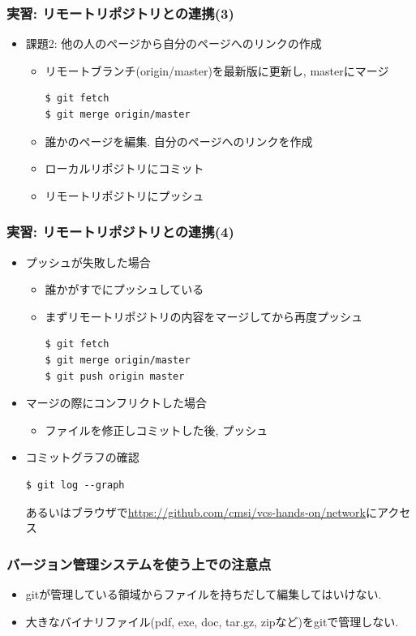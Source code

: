 \begin{frame}[t,fragile]
  \frametitle{実習: リモートリポジトリとの連携(3)}
  \begin{itemize}
  \item 課題2: 他の人のページから自分のページへのリンクの作成
    \begin{itemize}
      \item リモートブランチ(origin/master)を最新版に更新し, masterにマージ
\begin{lstlisting}
$ git fetch
$ git merge origin/master
\end{lstlisting}
      \item 誰かのページを編集. 自分のページヘのリンクを作成
      \item ローカルリポジトリにコミット
      \item リモートリポジトリにプッシュ
    \end{itemize}
  \end{itemize}
\end{frame}

\begin{frame}[t,fragile]
  \frametitle{実習: リモートリポジトリとの連携(4)}
  \begin{itemize}
  \item プッシュが失敗した場合
    \begin{itemize}
      \item 誰かがすでにプッシュしている
      \item まずリモートリポジトリの内容をマージしてから再度プッシュ
\begin{lstlisting}
$ git fetch
$ git merge origin/master
$ git push origin master
\end{lstlisting}
    \end{itemize}
  \item マージの際にコンフリクトした場合
    \begin{itemize}
      \item ファイルを修正しコミットした後, プッシュ
    \end{itemize}
  \item コミットグラフの確認
\begin{lstlisting}
$ git log --graph
\end{lstlisting}
    あるいはブラウザで\url{https://github.com/cmsi/vcs-hands-on/network}にアクセス
  \end{itemize}
\end{frame}

\begin{frame}
  \frametitle{バージョン管理システムを使う上での注意点}
  \begin{itemize}
  \item gitが管理している領域からファイルを持ちだして編集してはいけない. 
  \item 大きなバイナリファイル(pdf, exe, doc, tar.gz, zipなど)をgitで管理しない. 
  \end{itemize}
\end{frame}


